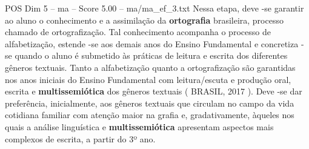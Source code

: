 \begin{textsample}{POS Dim 5 – ma – Score 5.00 – ma/ma\_ef\_3.txt}
Nessa etapa, deve -se garantir ao aluno o conhecimento e a assimilação da \textbf{ortografia} brasileira, processo chamado de ortografização.
Tal conhecimento acompanha o processo de alfabetização, estende -se aos demais anos do Ensino Fundamental e concretiza -se quando o aluno é submetido às práticas de leitura e escrita dos diferentes gêneros textuais.
Tanto a alfabetização quanto a ortografização são garantidas nos anos iniciais do Ensino Fundamental com leitura/escuta e produção oral, escrita e \textbf{multissemiótica} dos gêneros textuais ( BRASIL, 2017 ).
Deve -se dar preferência, inicialmente, aos gêneros textuais que circulam no campo da vida cotidiana familiar com atenção maior na grafia e, gradativamente, àqueles nos quais a análise linguística e \textbf{multissemiótica} apresentam aspectos mais complexos de escrita, a partir do 3º ano.

\end{textsample}

